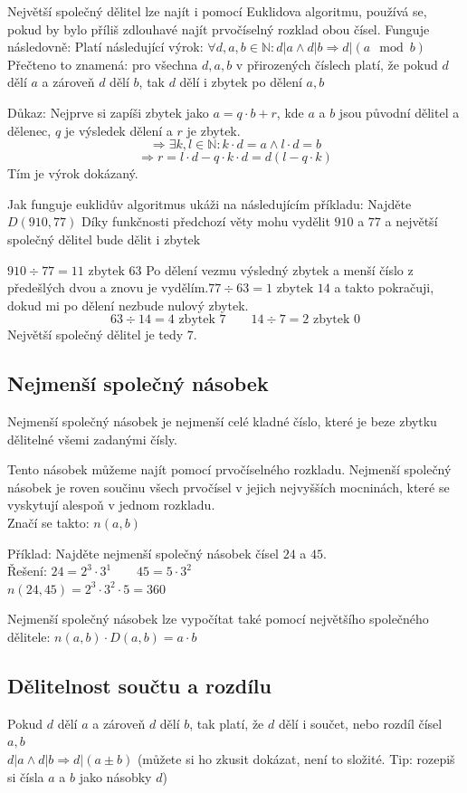 \documentclass[12pt]{article}
\begin{document}
Největší společný dělitel lze najít i pomocí Euklidova algoritmu, používá se, pokud by bylo příliš zdlouhavé najít prvočíselný rozklad obou čísel. Funguje následovně:
Platí následující výrok: $\forall d,a,b \in \mathbb{N}: d|a \land d|b \Rightarrow d|(a \mod b)$
Přečteno to znamená: pro všechna $d,a,b$ v přirozených číslech platí, že pokud $d$ dělí $a$ a zároveň $d$ dělí $b$, tak $d$ dělí i zbytek po dělení $a,b$

Důkaz: Nejprve si zapíši zbytek jako $a = q\cdot b + r$, kde $a$ a $b$ jsou původní dělitel a dělenec, $q$ je výsledek dělení a $r$ je zbytek.
\[\Rightarrow \exists k,l \in \mathbb{N}: k\cdot d = a \land l\cdot d = b\]
\[\Rightarrow r = l\cdot d - q\cdot k\cdot d = d(l-q\cdot k)\]
Tím je výrok dokázaný.

Jak funguje euklidův algoritmus ukáži na následujícím příkladu: Najděte $D(910,77)$
Díky funkčnosti předchozí věty mohu vydělit $910$ a $77$ a největší společný dělitel bude dělit i zbytek

$910 \div 77 = 11 \text{ zbytek } 63$ Po dělení vezmu výsledný zbytek a menší číslo z předešlých dvou a znovu je vydělím.$77 \div 63 = 1 \text{ zbytek } 14$ a takto pokračuji, dokud mi po dělení nezbude nulový zbytek.
\[63\div 14 = 4 \text{ zbytek } 7 \qquad 14\div 7 = 2 \text{ zbytek } 0\]
Největší společný dělitel je tedy $7$.

\subsection*{Nejmenší společný násobek}
Nejmenší společný násobek je nejmenší celé kladné číslo, které je beze zbytku dělitelné všemi zadanými čísly.

Tento násobek můžeme najít pomocí prvočíselného rozkladu. Nejmenší společný násobek je roven součinu všech prvočísel v jejich nejvyšších mocninách, které se vyskytují alespoň v jednom rozkladu.\\
Značí se takto: $n(a,b)$

Příklad: Najděte nejmenší společný násobek čísel $24$ a $45$.\\
Řešení: $24 = 2^3\cdot 3^1 \qquad 45 = 5\cdot 3^2$\\
$n(24,45) = 2^3 \cdot 3^2 \cdot 5 = 360$

Nejmenší společný násobek lze vypočítat také pomocí největšího společného dělitele: $n(a,b) \cdot D(a,b) = a\cdot b$

\subsection*{Dělitelnost součtu a rozdílu}
Pokud $d$ dělí $a$ a zároveň $d$ dělí $b$, tak platí, že $d$ dělí i součet, nebo rozdíl čísel $a,b$\\
$d|a \land d|b \Rightarrow d|(a\pm b)$ (můžete si ho zkusit dokázat, není to složité. Tip: rozepiš si čísla $a$ a $b$ jako násobky $d$)
\end{document}

